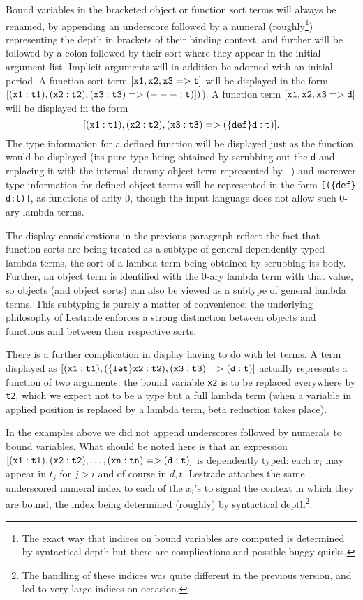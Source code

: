 \documentclass[12pt]{article}
\begin{document}
Bound variables in the bracketed object or function sort terms will always be renamed, by appending an underscore followed by a numeral (roughly\footnote{The exact way that indices on bound variables are computed is determined by syntactical depth but there are complications and possible buggy quirks.}) representing the depth in brackets of their binding context, and further will be followed by a colon followed by their sort where they appear in the initial argument list.   Implicit arguments will in addition be adorned with an initial period.  A function sort term ${\mathbb {\tt [x1, x2, x3 => t]}}$ will 
be displayed in the form ${\mathbb {\tt [(x1:t1), (x2:t2), (x3:t3) => (--- :t)]}})$).  A function term $\mathbb{{\tt [x1, x2, x3 => d]}}$ will be displayed in the form $${\mathbb{\tt [(x1:t1), (x2:t2), (x3:t3) => (\{def\} d : t)]}}.$$  The type information for a defined function will be displayed just as the function would be displayed (its pure type being obtained by scrubbing out the {\tt d} and replacing it with the internal dummy object term
represented by {\tt ---}) and moreover type information for defined object terms will be represented in the form {\tt [(\{def\} d:t)]}, as functions of arity 0, though the input language does not allow such 0-ary lambda terms. 

The display considerations in the previous paragraph reflect the fact that function sorts are being treated as a subtype of general dependently typed lambda terms, the sort of a lambda term being obtained by scrubbing its body.  Further, an object term is identified with the 0-ary lambda term with that value, so objects (and object sorts) can also be viewed as a subtype of general lambda terms.  This subtyping is purely a matter of convenience:  the underlying philosophy of Lestrade enforces a strong distinction between objects and functions and between their respective sorts.

There is a further complication in display having to do with let terms.  A term
displayed as ${\mathbb {\tt [(x1:t1),(\{let\} x2:t2),(x3:t3) => (d:t)]}}$ actually represents a function of two arguments:  the bound variable {\tt x2} is to be replaced everywhere
by {\tt t2}, which we expect not to be a type but a full lambda term (when a variable in applied position is replaced by a lambda term, beta reduction takes place).

In the examples above we did not append underscores followed by numerals to bound variables.  What should be noted here is that an expression
${\mathbb {\tt [(x1:t1),(x2:t2),\ldots,(xn:tn)=>(d:t)]}}$ is dependently typed:  each $x_i$ may appear in $t_j$ for $j>i$ and of course in $d,t$.  Lestrade attaches the same underscored numeral index to each of the $x_i$'s to signal the context in which they are bound, the index being determined (roughly) by syntactical depth\footnote{The handling of these indices was quite different in the previous version, and led to very large indices on occasion.}.
\end{document}
